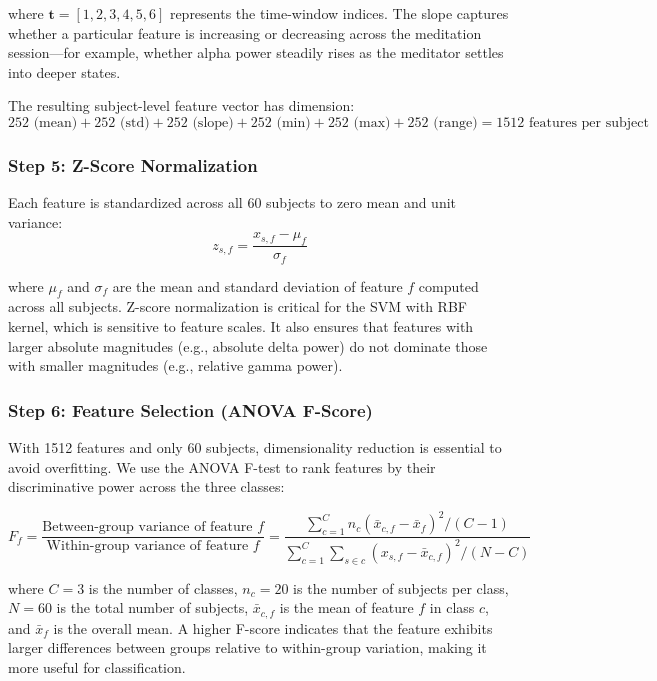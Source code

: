 \documentclass[12pt,a4paper]{article}
\begin{document}
where $\mathbf{t} = [1, 2, 3, 4, 5, 6]$ represents the time-window indices. The slope captures whether a particular feature is increasing or decreasing across the meditation session---for example, whether alpha power steadily rises as the meditator settles into deeper states.

The resulting subject-level feature vector has dimension:
\[
252 \text{ (mean)} + 252 \text{ (std)} + 252 \text{ (slope)} + 252 \text{ (min)} + 252 \text{ (max)} + 252 \text{ (range)} = 1512 \text{ features per subject}
\]

\subsubsection{Step 5: Z-Score Normalization}

Each feature is standardized across all 60 subjects to zero mean and unit variance:
\begin{equation}
z_{s,f} = \frac{x_{s,f} - \mu_f}{\sigma_f}
\label{eq:zscore}
\end{equation}

where $\mu_f$ and $\sigma_f$ are the mean and standard deviation of feature $f$ computed across all subjects. Z-score normalization is critical for the SVM with RBF kernel, which is sensitive to feature scales. It also ensures that features with larger absolute magnitudes (e.g., absolute delta power) do not dominate those with smaller magnitudes (e.g., relative gamma power).

\subsubsection{Step 6: Feature Selection (ANOVA F-Score)}

With 1512 features and only 60 subjects, dimensionality reduction is essential to avoid overfitting. We use the ANOVA F-test to rank features by their discriminative power across the three classes:

\begin{equation}
F_f = \frac{\text{Between-group variance of feature } f}{\text{Within-group variance of feature } f} = \frac{\sum_{c=1}^{C} n_c (\bar{x}_{c,f} - \bar{x}_f)^2 / (C-1)}{\sum_{c=1}^{C} \sum_{s \in c} (x_{s,f} - \bar{x}_{c,f})^2 / (N-C)}
\label{eq:anova}
\end{equation}

where $C=3$ is the number of classes, $n_c=20$ is the number of subjects per class, $N=60$ is the total number of subjects, $\bar{x}_{c,f}$ is the mean of feature $f$ in class $c$, and $\bar{x}_f$ is the overall mean. A higher F-score indicates that the feature exhibits larger differences between groups relative to within-group variation, making it more useful for classification.
\end{document}
